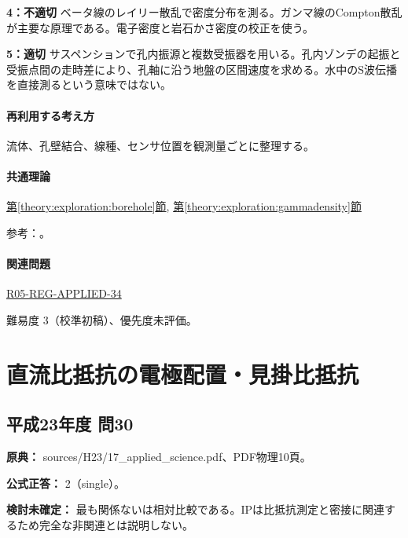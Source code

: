 \noindent\textbf{4：不適切} ベータ線のレイリー散乱で密度分布を測る。ガンマ線のCompton散乱が主要な原理である。電子密度と岩石かさ密度の校正を使う。\par

\noindent\textbf{5：適切} サスペンションで孔内振源と複数受振器を用いる。孔内ゾンデの起振と受振点間の走時差により、孔軸に沿う地盤の区間速度を求める。水中のS波伝播を直接測るという意味ではない。\par

\paragraph{再利用する考え方} 流体、孔壁結合、線種、センサ位置を観測量ごとに整理する。

\paragraph{共通理論} \hyperref[theory:exploration:borehole]{第\ref*{theory:exploration:borehole}節}, \hyperref[theory:exploration:gammadensity]{第\ref*{theory:exploration:gammadensity}節}

\par 参考：\cite{epa_borehole_resistivity,epa_gamma_density,geebec_ps,oyo_suspension}。

\paragraph{関連問題} \hyperref[q:r05-reg-applied-34]{R05-REG-APPLIED-34}

\par 難易度 3（校準初稿）、優先度未評価。

\section{直流比抵抗の電極配置・見掛比抵抗}

\subsection{平成23年度 問30}
\label{q:h23-reg-applied-30}

\noindent\textbf{原典：} sources/H23/17\_applied\_science.pdf、PDF物理10頁。

\textbf{公式正答：} 2（single）。

\par\textbf{検討未確定：} 最も関係ないは相対比較である。IPは比抵抗測定と密接に関連するため完全な非関連とは説明しない。

